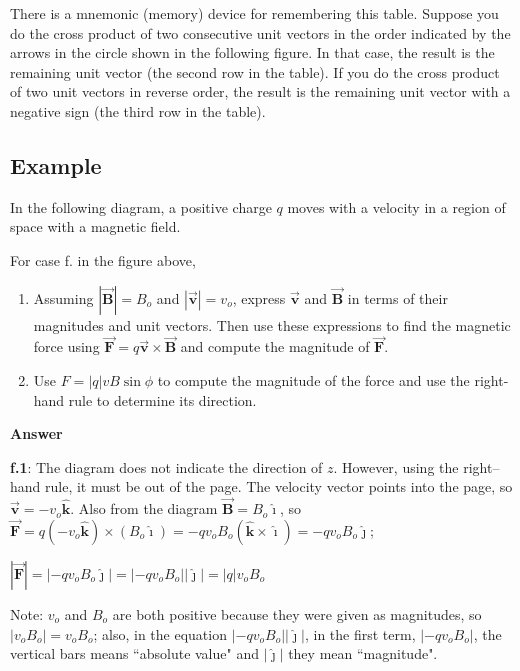 \documentclass{article}
\newcommand{\ihat}[0]{\hat{\boldsymbol{\imath}}}
\newcommand{\jhat}[0]{\hat{\boldsymbol{\jmath}}}
\newcommand{\khat}[0]{\hat{\boldsymbol{k}}}
\newcommand{\bfvec}[1]{\vec{\mathbf{#1}}}
\begin{document}
There is a mnemonic (memory) device for remembering this table. Suppose you do the cross product of two consecutive unit vectors in the order indicated by the arrows in the circle shown in the following figure. In that case, the result is the remaining unit vector (the second row in the table). If you do the cross product of two unit vectors in reverse order, the result is the remaining unit vector with a negative sign (the third row in the table).



\subsection{Example}

In the following diagram, a positive charge $q$ moves with a velocity in a region of space with a magnetic field.



For case f. in the figure above,

\begin{enumerate}

  \item Assuming $|\bfvec{B}|=B_o$ and $|\bfvec{v}|=v_o$, express $\bfvec{v}$ and $\bfvec{B}$ in terms of their magnitudes and unit vectors. Then use these expressions to find the magnetic force using $\bfvec{F} = q\bfvec{v}\times\bfvec{B}$ and compute the magnitude of $\bfvec{F}$.

  \item Use $F = |q|vB\sin\phi$ to compute the magnitude of the force and use the right-hand rule to determine its direction.

\end{enumerate}

\textbf{Answer}

\textbf{f.1}: The diagram does not indicate the direction of $z$. However, using the right--hand rule, it must be out of the page. The velocity vector points into the page, so $\bfvec{v}=-v_o\khat$. Also from the diagram $\bfvec{B}=B_o\ihat$, so $\bfvec{F} = q(-v_o\khat)\times (B_o\ihat)=-qv_oB_o(\khat\times \ihat)=-qv_oB_o\jhat$;

$|\bfvec{F}|=|-qv_oB_o\jhat| = |-qv_oB_o||\jhat|=|q|v_oB_o$

Note: $v_o$ and $B_o$ are both positive because they were given as magnitudes, so $|v_oB_o|=v_oB_o$; also, in the equation $|-qv_oB_o||\jhat|$, in the first term, $|-qv_oB_o|$, the vertical bars means ``absolute value" and $|\jhat|$ they mean ``magnitude".
\end{document}

